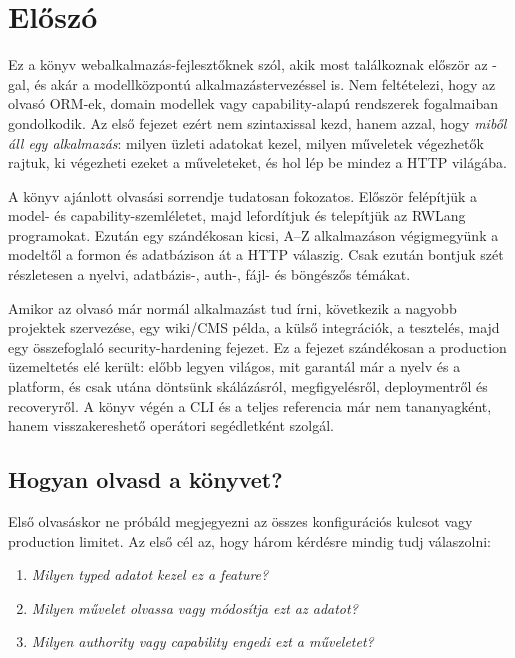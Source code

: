 \chapter*{Előszó}

Ez a könyv webalkalmazás-fejlesztőknek szól, akik most találkoznak először az \rwlang{}-gal, és akár a modellközpontú alkalmazástervezéssel is. Nem feltételezi, hogy az olvasó ORM-ek, domain modellek vagy capability-alapú rendszerek fogalmaiban gondolkodik. Az első fejezet ezért nem szintaxissal kezd, hanem azzal, hogy \emph{miből áll egy alkalmazás}: milyen üzleti adatokat kezel, milyen műveletek végezhetők rajtuk, ki végezheti ezeket a műveleteket, és hol lép be mindez a HTTP világába.

A könyv ajánlott olvasási sorrendje tudatosan fokozatos. Először felépítjük a model- és capability-szemléletet, majd lefordítjuk és telepítjük az RWLang programokat. Ezután egy szándékosan kicsi, A--Z alkalmazáson végigmegyünk a modeltől a formon és adatbázison át a HTTP válaszig. Csak ezután bontjuk szét részletesen a nyelvi, adatbázis-, auth-, fájl- és böngészős témákat.

Amikor az olvasó már normál alkalmazást tud írni, következik a nagyobb projektek szervezése, egy wiki/CMS példa, a külső integrációk, a tesztelés, majd egy összefoglaló security-hardening fejezet. Ez a fejezet szándékosan a production üzemeltetés elé került: előbb legyen világos, mit garantál már a nyelv és a platform, és csak utána döntsünk skálázásról, megfigyelésről, deploymentről és recoveryről. A könyv végén a CLI és a teljes  referencia már nem tananyagként, hanem visszakereshető operátori segédletként szolgál.

\section*{Hogyan olvasd a könyvet?}

Első olvasáskor ne próbáld megjegyezni az összes konfigurációs kulcsot vagy production limitet. Az első cél az, hogy három kérdésre mindig tudj válaszolni:

\begin{enumerate}
  \item \emph{Milyen typed adatot kezel ez a feature?}
  \item \emph{Milyen művelet olvassa vagy módosítja ezt az adatot?}
  \item \emph{Milyen authority vagy capability engedi ezt a műveletet?}
\end{enumerate}

